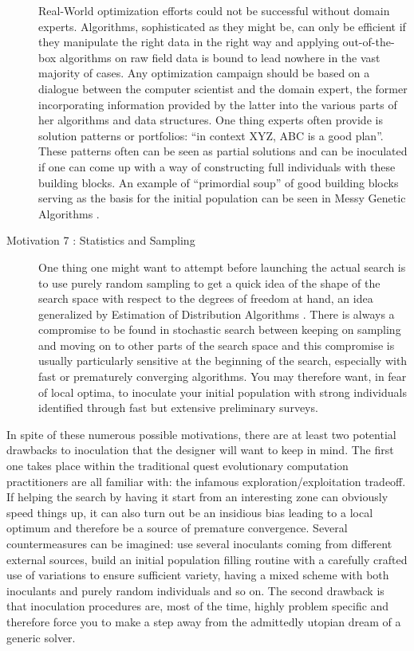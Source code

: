 \documentclass[english]{DESCARWINreport}
\begin{document}
\begin{description}
Real-World optimization efforts could not be successful without domain experts. Algorithms, sophisticated as they might be, can only be efficient if they manipulate the right data in the right way and applying out-of-the-box algorithms on raw field data is bound to lead nowhere in the vast majority of cases. Any optimization campaign should be based on a dialogue between the computer scientist and the domain expert, the former incorporating information provided by the latter into the various parts of her algorithms and data structures. One thing experts often provide is solution patterns or portfolios: ``in context XYZ, ABC is a good plan''. These patterns often can be seen as partial solutions and can be inoculated if one can come up with a way of constructing full individuals with these building blocks. An example of ``primordial soup'' of good building blocks serving as the basis for the initial population can be seen in Messy Genetic Algorithms \cite{Kargupta95search}.

\item[Motivation 7 : Statistics and Sampling]

One thing one might want to attempt before launching the actual search is to use purely random sampling to get a quick idea of the shape of the search space with respect to the degrees of freedom at hand, an idea generalized by Estimation of Distribution Algorithms \cite{Baluja95removingthe, Larranaga:2002b}
. There is always a compromise to be found in stochastic search between keeping on sampling and moving on to other parts of the search space and this compromise is usually particularly sensitive at the beginning of the search, especially with fast or prematurely converging algorithms. You may therefore want, in fear of local optima, to inoculate your initial population with strong individuals identified through fast but extensive preliminary surveys.


\end{description}


In spite of these numerous possible motivations, there are at least two potential drawbacks to inoculation that the designer will want to keep in mind. The first one takes place within the traditional quest evolutionary computation practitioners are all familiar with: the infamous exploration/exploitation tradeoff. If helping the search by having it start from an interesting zone can obviously speed things up, it can also turn out be an insidious bias leading to a local optimum and therefore be a source of premature convergence. Several countermeasures can be imagined: use several inoculants coming from different external sources, build an initial population filling routine with a carefully crafted use of variations to ensure sufficient variety, having a mixed scheme with both inoculants and purely random individuals and so on. The second drawback is that inoculation procedures are, most of the time, highly problem specific and therefore force you to make a step away from the admittedly utopian dream of a generic solver.
\end{document}

